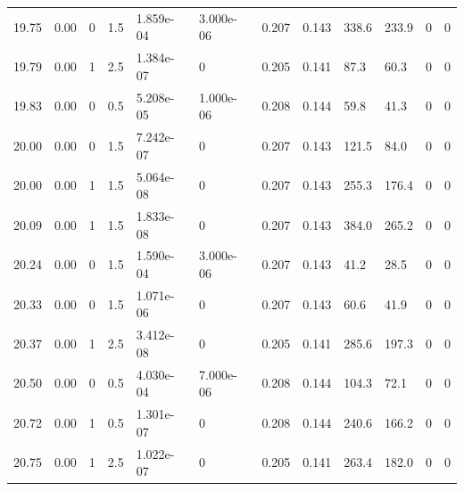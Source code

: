 \documentclass[preview]{standalone}
\begin{document}
{{{{{{\begin{tabular}{L{1.2cm}C{1.2cm} C{0.3cm}C{0.5cm} C{1.4cm}C{1.4cm} C{1.4cm}C{1.4cm} C{1.6cm}C{1.6cm} C{1.6cm}C{1.6cm}}
  19.75  &  0.00  & 0     & 1.5 &  1.859e-04  & 3.000e-06  &  0.207&   0.143& 338.6 & 233.9   &  0 & 0  \\ 
  19.79  &  0.00  & 1     & 2.5 &  1.384e-07  & 0  &  0.205&   0.141& 87.3 & 60.3   &  0 & 0  \\ 
  19.83  &  0.00  & 0     & 0.5 &  5.208e-05  & 1.000e-06  &  0.208&   0.144& 59.8 & 41.3   &  0 & 0  \\ 
  20.00  &  0.00  & 0     & 1.5 &  7.242e-07  & 0  &  0.207&   0.143& 121.5 & 84.0   &  0 & 0  \\ 
  20.00  &  0.00  & 1     & 1.5 &  5.064e-08  & 0  &  0.207&   0.143& 255.3 & 176.4   &  0 & 0  \\ 
  20.09  &  0.00  & 1     & 1.5 &  1.833e-08  & 0  &  0.207&   0.143& 384.0 & 265.2   &  0 & 0  \\ 
  20.24  &  0.00  & 0     & 1.5 &  1.590e-04  & 3.000e-06  &  0.207&   0.143& 41.2 & 28.5   &  0 & 0  \\ 
  20.33  &  0.00  & 0     & 1.5 &  1.071e-06  & 0  &  0.207&   0.143& 60.6 & 41.9   &  0 & 0  \\ 
  20.37  &  0.00  & 1     & 2.5 &  3.412e-08  & 0  &  0.205&   0.141& 285.6 & 197.3   &  0 & 0  \\ 
  20.50  &  0.00  & 0     & 0.5 &  4.030e-04  & 7.000e-06  &  0.208&   0.144& 104.3 & 72.1   &  0 & 0  \\ 
  20.72  &  0.00  & 1     & 0.5 &  1.301e-07  & 0  &  0.208&   0.144& 240.6 & 166.2   &  0 & 0  \\ 
  20.75  &  0.00  & 1     & 2.5 &  1.022e-07  & 0  &  0.205&   0.141& 263.4 & 182.0   &  0 & 0  \\ 
\hline 
\end{tabular} 

}}}}}}
\end{document}
